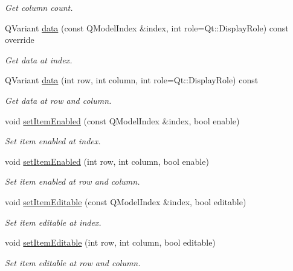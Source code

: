 \begin{DoxyCompactItemize}
\begin{DoxyCompactList}\small\item\em Get column count. \end{DoxyCompactList}\item 
Q\+Variant \hyperlink{class_mdt_1_1_item_model_1_1_variant_table_model_a88bb1b4c736812bfd14e9008923c39a4}{data} (const Q\+Model\+Index \&index, int role=Qt\+::\+Display\+Role) const override
\begin{DoxyCompactList}\small\item\em Get data at index. \end{DoxyCompactList}\item 
Q\+Variant \hyperlink{class_mdt_1_1_item_model_1_1_variant_table_model_a5a232a35eadb8d96a40679207ad5d4d2}{data} (int row, int column, int role=Qt\+::\+Display\+Role) const 
\begin{DoxyCompactList}\small\item\em Get data at row and column. \end{DoxyCompactList}\item 
void \hyperlink{class_mdt_1_1_item_model_1_1_variant_table_model_abd94c5d8358c6951bfefd405ead3228f}{set\+Item\+Enabled} (const Q\+Model\+Index \&index, bool enable)
\begin{DoxyCompactList}\small\item\em Set item enabled at index. \end{DoxyCompactList}\item 
void \hyperlink{class_mdt_1_1_item_model_1_1_variant_table_model_ac440fe0392eab209d6950bfeb4cc9397}{set\+Item\+Enabled} (int row, int column, bool enable)
\begin{DoxyCompactList}\small\item\em Set item enabled at row and column. \end{DoxyCompactList}\item 
void \hyperlink{class_mdt_1_1_item_model_1_1_variant_table_model_a9c7a72625c0e4bf871f0e25773937b57}{set\+Item\+Editable} (const Q\+Model\+Index \&index, bool editable)
\begin{DoxyCompactList}\small\item\em Set item editable at index. \end{DoxyCompactList}\item 
void \hyperlink{class_mdt_1_1_item_model_1_1_variant_table_model_a0d3bc90ae245bb011b98718b0d83e786}{set\+Item\+Editable} (int row, int column, bool editable)
\begin{DoxyCompactList}\small\item\em Set item editable at row and column. \end{DoxyCompactList}\item 

\end{DoxyCompactItemize}
